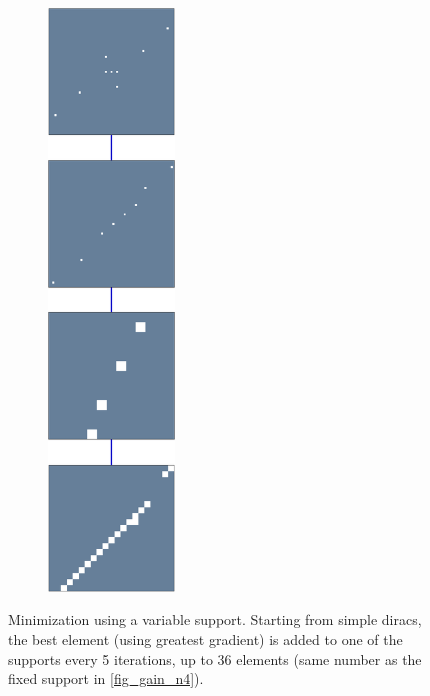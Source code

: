\begin{figure}[!ht]
\begin{subfigure}[b]{0.4\textwidth}
\begin{subfigure}[b]{1\textwidth}
	\end{subfigure}
\end{subfigure}
\begin{subfigure}[b]{0.4\textwidth}\centering
\includegraphics[width=0.37\textwidth]{figures/variable_support/support.pdf}
\end{subfigure}
\caption{Minimization using a variable support. Starting from simple diracs, the best element (using greatest gradient) is added to one of the supports every 5 iterations, up to 36 elements (same number as the fixed support in \cref{fig_gain_n4}).} \label{fig_variable_support}
\end{figure}







